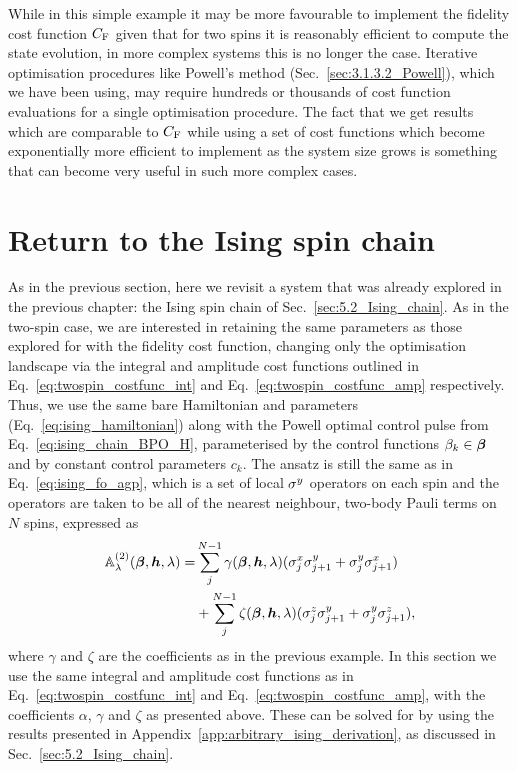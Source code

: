 While in this simple example it may be more favourable to implement the fidelity cost function $C_{\rm F}$ given that for two spins it is reasonably efficient to compute the state evolution, in more complex systems this is no longer the case. Iterative optimisation procedures like Powell's method (Sec.~\ref{sec:3.1.3.2_Powell}), which we have been using, may require hundreds or thousands of cost function evaluations for a single optimisation procedure. The fact that we get results which are comparable to $C_{\rm F}$ while using a set of cost functions which become exponentially more efficient to implement as the system size grows is something that can become very useful in such more complex cases.

\section{Return to the Ising spin chain}\label{sec:7.2_ising_ho_lcd}

As in the previous section, here we revisit a system that was already explored in the previous chapter: the Ising spin chain of Sec.~\ref{sec:5.2_Ising_chain}. As in the two-spin case, we are interested in retaining the same parameters as those explored for  with the fidelity cost function, changing only the optimisation landscape via the integral and amplitude cost functions outlined in Eq.~\eqref{eq:twospin_costfunc_int} and Eq.~\eqref{eq:twospin_costfunc_amp} respectively. Thus, we use the same bare Hamiltonian and parameters (Eq.~\eqref{eq:ising_hamiltonian}) along with the Powell optimal control pulse from Eq.~\eqref{eq:ising_chain_BPO_H}, parameterised by the control functions $\beta_k \in \boldsymbol{\beta}$ and by constant control parameters $c_k$. The   ansatz is still the same as in Eq.~\eqref{eq:ising_fo_agp}, which is a set of local $\sigma^y$ operators on each spin and the  operators are taken to be all of the nearest neighbour, two-body Pauli terms on $N$ spins, expressed as
\begin{equation}\label{eq:ising_so_lcd_terms}
    \begin{aligned}
        \mathbb{A}_{\lambda}^{(2)}(\boldsymbol{\beta}, \boldsymbol{h}, \lambda) = & \sum_j^{N-1} \gamma(\boldsymbol{\beta}, \boldsymbol{h}, \lambda) (\sigma^x_j\sigma^y_{j+1} + \sigma^y_j\sigma^x_{j+1}) \\
        &+ \sum_j^{N-1} \zeta(\boldsymbol{\beta}, \boldsymbol{h}, \lambda) (\sigma^z_j\sigma^y_{j+1} + \sigma^y_j\sigma^z_{j+1}),
    \end{aligned}
\end{equation}
where $\gamma$ and $\zeta$ are the   coefficients as in the previous example. In this section we use the same integral and amplitude cost functions as in Eq.~\eqref{eq:twospin_costfunc_int} and Eq.~\eqref{eq:twospin_costfunc_amp}, with the coefficients $\alpha$, $\gamma$ and $\zeta$ as presented above. These can be solved for by using the results presented in Appendix~\ref{app:arbitrary_ising_derivation}, as discussed in Sec.~\ref{sec:5.2_Ising_chain}.

